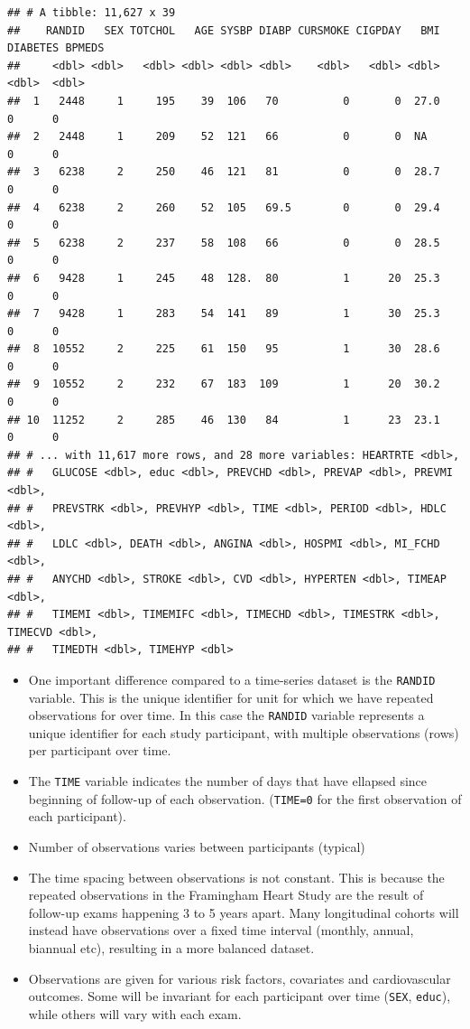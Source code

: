\documentclass[
]{book}
\providecommand{\tightlist}{%
  \setlength{\itemsep}{0pt}\setlength{\parskip}{0pt}}
\begin{document}
\begin{verbatim}
## # A tibble: 11,627 x 39
##    RANDID   SEX TOTCHOL   AGE SYSBP DIABP CURSMOKE CIGPDAY   BMI DIABETES BPMEDS
##     <dbl> <dbl>   <dbl> <dbl> <dbl> <dbl>    <dbl>   <dbl> <dbl>    <dbl>  <dbl>
##  1   2448     1     195    39  106   70          0       0  27.0        0      0
##  2   2448     1     209    52  121   66          0       0  NA          0      0
##  3   6238     2     250    46  121   81          0       0  28.7        0      0
##  4   6238     2     260    52  105   69.5        0       0  29.4        0      0
##  5   6238     2     237    58  108   66          0       0  28.5        0      0
##  6   9428     1     245    48  128.  80          1      20  25.3        0      0
##  7   9428     1     283    54  141   89          1      30  25.3        0      0
##  8  10552     2     225    61  150   95          1      30  28.6        0      0
##  9  10552     2     232    67  183  109          1      20  30.2        0      0
## 10  11252     2     285    46  130   84          1      23  23.1        0      0
## # ... with 11,617 more rows, and 28 more variables: HEARTRTE <dbl>,
## #   GLUCOSE <dbl>, educ <dbl>, PREVCHD <dbl>, PREVAP <dbl>, PREVMI <dbl>,
## #   PREVSTRK <dbl>, PREVHYP <dbl>, TIME <dbl>, PERIOD <dbl>, HDLC <dbl>,
## #   LDLC <dbl>, DEATH <dbl>, ANGINA <dbl>, HOSPMI <dbl>, MI_FCHD <dbl>,
## #   ANYCHD <dbl>, STROKE <dbl>, CVD <dbl>, HYPERTEN <dbl>, TIMEAP <dbl>,
## #   TIMEMI <dbl>, TIMEMIFC <dbl>, TIMECHD <dbl>, TIMESTRK <dbl>, TIMECVD <dbl>,
## #   TIMEDTH <dbl>, TIMEHYP <dbl>
\end{verbatim}

\begin{itemize}
\tightlist
\item
  One important difference compared to a time-series dataset is the \texttt{RANDID} variable. This is the unique identifier for unit for which we have repeated observations for over time.
  In this case the \texttt{RANDID} variable represents a unique identifier for each study participant, with multiple observations (rows) per participant over time.
\item
  The \texttt{TIME} variable indicates the number of days that have ellapsed since beginning of follow-up of each observation. (\texttt{TIME=0} for the first observation of each participant).
\item
  Number of observations varies between participants (typical)
\item
  The time spacing between observations is not constant. This is because the repeated observations in the Framingham Heart Study are the result of follow-up exams happening 3 to 5 years apart. Many longitudinal cohorts will instead have observations over a fixed time interval (monthly, annual, biannual etc), resulting in a more balanced dataset.
\item
  Observations are given for various risk factors, covariates and cardiovascular outcomes. Some will be invariant for each participant over time (\texttt{SEX}, \texttt{educ}), while others will vary with each exam.
\end{itemize}
\end{document}
